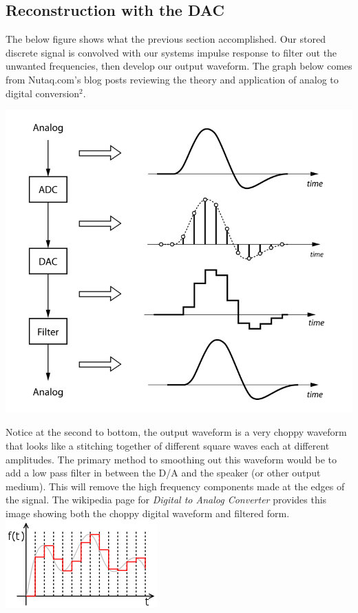 \documentclass[12pt]{article}
\begin{document}
\subsection{Reconstruction with the DAC}
The below figure shows what the previous section accomplished. Our stored discrete signal is convolved with our systems impulse response to filter out the unwanted frequencies, then develop our output waveform. The graph below comes from Nutaq.com's blog posts reviewing the theory and application of analog to digital conversion$^2$.
\\
\begin{center}
\includegraphics[scale=.5]{AtoD_signalsteps}
\end{center}

Notice at the second to bottom, the output waveform is a very choppy waveform that looks like a stitching together of different square waves each at different amplitudes. The primary method to smoothing out this waveform would be to add a low pass filter in between the D/A and the speaker (or other output medium). This will remove the high frequency components made at the edges of the signal. The wikipedia page for \textit{Digital to Analog Converter} provides this image showing both the choppy digital waveform and filtered form.\\ 
\includegraphics[scale=1]{digitalsmoothed}
\end{document}
